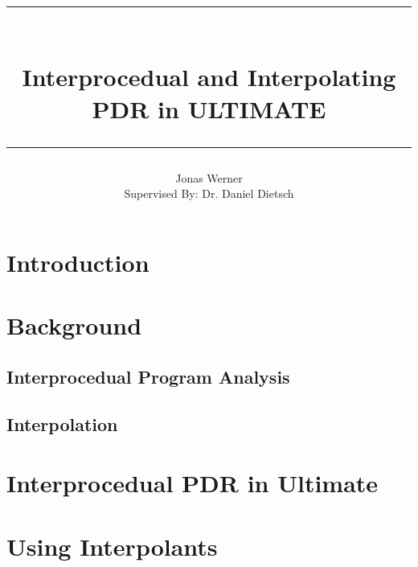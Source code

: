 \documentclass{article}
\begin{document}
	\newcommand{\HorizontalLine}{\rule{\linewidth}{0.3mm}}
	
	\title{ \HorizontalLine \\ \textbf{Interprocedual and Interpolating \\ PDR in \textsc{ULTIMATE}} \HorizontalLine}
	

	
	\author{Jonas Werner \\ Supervised By: Dr. Daniel Dietsch}


	
	\date{}
	
	\maketitle
	
	\begin{abstract}

	\end{abstract}
	
	
	\section{Introduction}
	
	\section{Background}
	\subsection{Interprocedual Program Analysis}
	
	\subsection{Interpolation}
	
	
	\section{Interprocedual PDR in Ultimate}
	
	\section{Using Interpolants}
	

	
\end{document}
